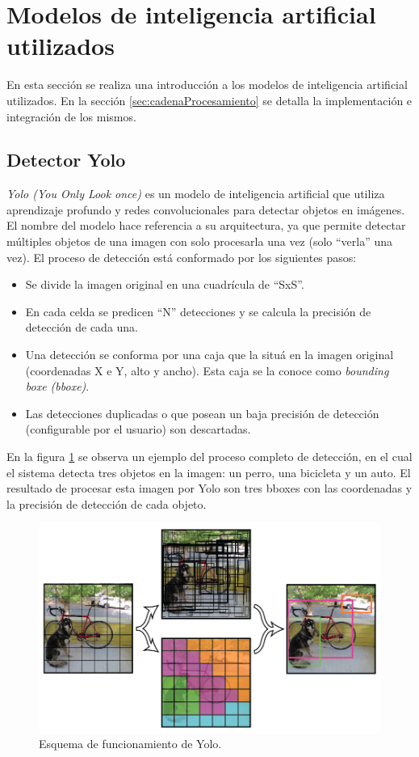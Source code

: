 \section{Modelos de inteligencia artificial utilizados}
\label{sec:modelosIA}

En esta sección se realiza una introducción a los modelos de inteligencia artificial utilizados. En la sección \ref{sec:cadenaProcesamiento} se detalla la implementación e integración de los mismos.

\subsection{Detector Yolo}

\textit{Yolo (You Only Look once)} es un modelo de inteligencia artificial que utiliza aprendizaje profundo y redes convolucionales para detectar objetos en imágenes. El nombre del modelo hace referencia a su arquitectura, ya que permite detectar múltiples objetos de una imagen con solo procesarla una vez (solo ``verla'' una vez). El proceso de detección está conformado por los siguientes pasos:

\begin{itemize}
\item Se divide la imagen original en una cuadrícula de ``SxS''.
\item En cada celda se predicen ``N'' detecciones y se calcula la precisión de detección de cada una.
\item Una detección se conforma por una caja que la situá en la imagen original (coordenadas X e Y, alto y ancho). Esta caja se la conoce como \textit{bounding boxe (bboxe)}.
\item Las detecciones duplicadas o que posean un baja precisión de detección (configurable por el usuario) son descartadas.
\end{itemize}

En la figura \ref{fig:diagramaYolo} se observa un ejemplo del proceso completo de detección, en el cual el sistema detecta tres objetos en la imagen: un perro, una bicicleta y un auto. El resultado de procesar esta imagen por Yolo son tres bboxes con las coordenadas y la precisión de detección de cada objeto.

\begin{figure}[ht]
	\centering
	\includegraphics[scale=.60]{./Figures/yolo.png}
	\caption{Esquema de funcionamiento de Yolo\protect\footnotemark.}
	\label{fig:diagramaYolo}
\end{figure}

